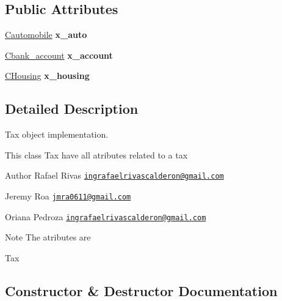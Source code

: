 \subsection*{Public Attributes}
\begin{DoxyCompactItemize}
\item 
\hyperlink{class_cautomobile}{Cautomobile} {\bfseries x\+\_\+auto}\hypertarget{class_ctax__user_a809341101dc07cfd884ed1f2564e47bb}{}\label{class_ctax__user_a809341101dc07cfd884ed1f2564e47bb}

\item 
\hyperlink{class_cbank__account}{Cbank\+\_\+account} {\bfseries x\+\_\+account}\hypertarget{class_ctax__user_a7adb2c2de9b0cd0a1b316a37bbd06b7e}{}\label{class_ctax__user_a7adb2c2de9b0cd0a1b316a37bbd06b7e}

\item 
\hyperlink{class_c_housing}{C\+Housing} {\bfseries x\+\_\+housing}\hypertarget{class_ctax__user_a77308f914bbee6ce2c6c1b265411e70b}{}\label{class_ctax__user_a77308f914bbee6ce2c6c1b265411e70b}

\end{DoxyCompactItemize}


\subsection{Detailed Description}
Tax object implementation. 

This class Tax have all atributes related to a tax \begin{DoxyAuthor}{Author}
Rafael Rivas  \href{mailto:ingrafaelrivascalderon@gmail.com}{\tt ingrafaelrivascalderon@gmail.\+com} 

Jeremy Roa  \href{mailto:jmra0611@gmail.com}{\tt jmra0611@gmail.\+com} 

Oriana Pedroza  \href{mailto:ingrafaelrivascalderon@gmail.com}{\tt ingrafaelrivascalderon@gmail.\+com} 
\end{DoxyAuthor}
\begin{DoxyNote}{Note}
The atributes are
\end{DoxyNote}

\begin{DoxyItemize}
\item Tax 
\end{DoxyItemize}

\subsection{Constructor \& Destructor Documentation}
